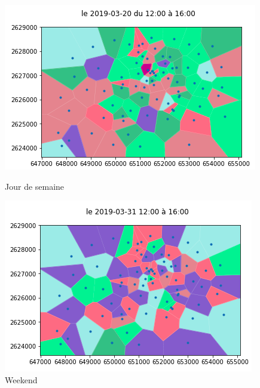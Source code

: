 \documentclass{report}
\begin{document}
\begin{figure}[H]
  \begin{minipage}{0.4\textwidth}
    \centering
    \includegraphics[scale=0.55]{images/S12_16.png}
    \caption{Jour de semaine}\label{Fig:Data1}
  \end{minipage}\hfill
  \begin{minipage}{0.4\textwidth}
    \centering
    \includegraphics[scale=0.55]{images/W12_16.png}
    \caption{Weekend}\label{Fig:Data2}
  \end{minipage}
\end{figure} 
\end{document}
